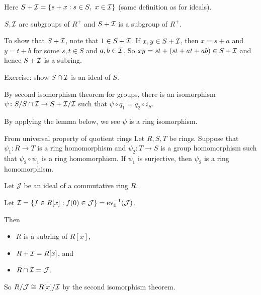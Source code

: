 \documentclass[12pt,letterpaper]{report}
\begin{document}
\begin{center}
\end{center}

Here $S + \mathcal{I} = \{s + x : s \in S, \ x \in \mathcal{I}\}$ (same definition as for ideals).

\begin{thmproof}
  $S, \mathcal{I}$ are subgroups of $R^+$ and $S + \mathcal{I}$ is a subgroup of $R^+$.

  To show that $S + \mathcal{I}$, note that $1 \in S + \mathcal{I}$.
  If $x, y \in S + \mathcal{I}$, then $x = s + a$ and $y = t + b$ for some $s, t \in S$ and
  $a, b \in \mathcal{I}$.
  So $xy = st + (st + at + ab) \in S + \mathcal{I}$ and hence $S + \mathcal{I}$ is a subring.

  Exercise: show $S \cap \mathcal{I}$ is an ideal of $S$.

  By second isomorphism theorem for groups, there is an isomorphism
  $\psi \colon S/S \cap \mathcal{I} \to S + \mathcal{I}/\mathcal{I}$ such that $\psi \circ q_1 = q_2 \circ i_S$.

  By applying the lemma below, we see $\psi$ is a ring isomorphism.
\end{thmproof}

\begin{lem}{From universal property of quotient rings}{}
  Let $R, S, T$ be rings.
  Suppose that $\psi_1 \colon R \to T$ is a ring homomorphism and $\psi_2 \colon T \to S$ is a
  group homomorphism such that $\psi_2 \circ \psi_1$ is a ring homomorphism.
  If $\psi_1$ is surjective, then $\psi_2$ is a ring homomorphism.
\end{lem}

\begin{ex}
  Let $\mathcal{J}$ be an ideal of a commutative ring $R$.

  Let $\mathcal{I} = \{f \in R[x] : f(0) \in \mathcal{J}\} = \operatorname{ev}_0^{-1}(\mathcal{J})$.

  Then
  \begin{itemize}
    \item $R$ is a subring of $R[x]$,
    \item $R + \mathcal{I} = R[x]$, and
    \item $R \cap \mathcal{I} = \mathcal{J}$.
  \end{itemize}
  So $R/\mathcal{J} \cong R[x]/\mathcal{I}$ by the second isomorphism theorem.
\end{ex}
\end{document}
